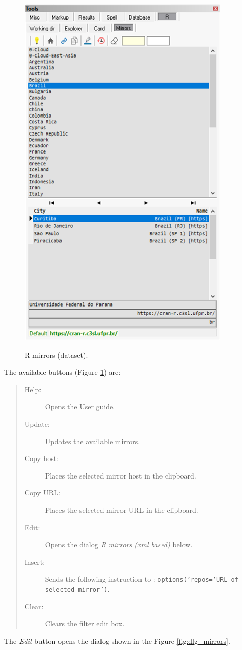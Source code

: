 \begin{figure}[H]
  \includegraphics[scale=0.35]{./res/tools_r_mirrors.png}\\
  \caption{R mirrors (dataset).}
  \label{fig:tools_dlg_mirrors}
\end{figure}

The available buttons
(Figure \ref{fig:tools_dlg_mirrors})
are:

\begin{quote}
  \begin{footnotesize}
    \begin{description}
      \item[Help:]
        Opens the User guide.
      \item[Update:]
        Updates the available \RR{} mirrors.
      \item[Copy host:]
        Places the selected mirror host in the clipboard.
      \item[Copy URL:]
        Places the selected mirror URL in the clipboard.
      \item[Edit:]
        Opens the dialog \textit{R mirrors (xml based)} below.
      \item[Insert:]
        Sends the following instruction to \RR{}: \texttt{options('repos='URL of selected mirror')}.
      \item [Clear:]
        Clears the filter edit box.
    \end{description}
  \end{footnotesize}
\end{quote}

The \textit{Edit} button opens the dialog shown in the Figure \ref{fig:dlg_mirrors}.
